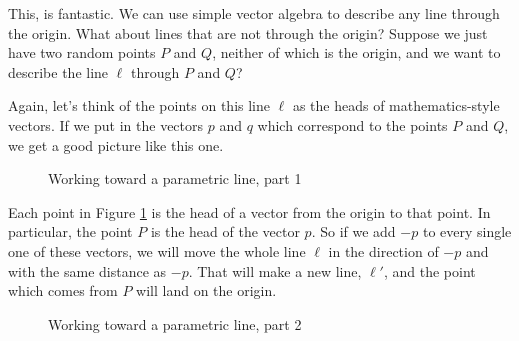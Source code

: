 \documentclass[00-livre-main.tex]{subfiles}
\begin{document}
This, is fantastic. We can use simple vector algebra to describe any line through the origin.
What about lines that are not through the origin?
Suppose we just have two random points $P$ and $Q$, neither of which is the origin, and we want to describe the line $\ell$ through $P$ and $Q$?

Again, let's think of the points on this line $\ell$ as the heads of mathematics-style vectors.
If we put in the vectors $p$ and $q$ which correspond to the points $P$ and $Q$, we get a good picture like this one.

\begin{figure}[h!]
\centering
{}
\caption{Working toward a parametric line, part 1}
\label{fig:param-line1}
\end{figure}

Each point in Figure \ref{fig:param-line1} is the head of a vector from the origin to that point.
In particular, the point $P$ is the head of the vector $p$.
So if we add $-p$ to every single one of these vectors, we will move the whole line $\ell$ in the direction of $-p$ and with the same distance as $-p$.
That will make a new line, $\ell'$, and the point which comes from $P$ will land on the origin.


\begin{figure}[h!]
\centering
{}
\caption{Working toward a parametric line, part 2}
\label{fig:param-line2}
\end{figure}
\end{document}
